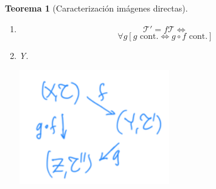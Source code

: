 \documentclass[10pt,a4paper,openright]{book}
\theoremstyle{break}
\newtheorem*{theo}{Teorema}
\begin{document}
\begin{theo}[Caracterización imágenes directas]
\begin{enumerate}
    \item
    \[
    \mathcal{T}' = f\mathcal{T} \Leftrightarrow  
    \]
    \begin{equation}
        \forall g \left[ g \text{ cont.} \Leftrightarrow g \circ f \text{ cont.} \right]
    \end{equation}

    \item Y.
    \begin{center}
        \includegraphics[scale=0.3]{images/caracterizacion_img_dir} 
    \end{center}
\end{enumerate}
\end{theo}
\end{document}
